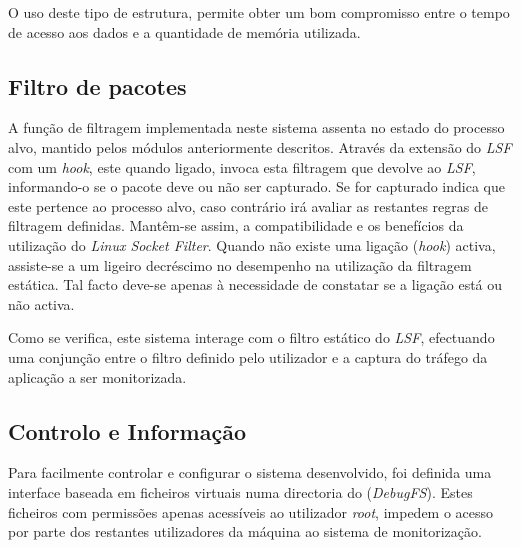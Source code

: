 O uso deste tipo de estrutura, permite obter um bom compromisso entre o tempo de acesso aos dados e a quantidade de memória utilizada.


\subsection{Filtro de pacotes}
\label{sub:packet_filter}

A função de filtragem implementada neste sistema assenta no estado do processo alvo, mantido pelos módulos anteriormente descritos.
Através da extensão do \textit{LSF} com um \textit{hook}, este quando ligado, invoca esta filtragem que devolve ao \textit{LSF}, informando-o se o pacote deve ou não ser capturado.
Se for capturado indica que este pertence ao processo alvo, caso contrário irá avaliar as restantes regras de filtragem definidas.
Mantêm-se assim, a compatibilidade e os benefícios da utilização do \textit{Linux Socket Filter}.
Quando não existe uma ligação (\textit{hook}) activa, assiste-se a um ligeiro decréscimo no desempenho na utilização da filtragem estática.
Tal facto deve-se apenas à necessidade de constatar se a ligação está ou não activa.

Como se verifica, este sistema interage com o filtro estático do \textit{LSF}, efectuando uma conjunção entre o filtro definido pelo utilizador e a captura do tráfego da aplicação a ser monitorizada.


\subsection{Controlo e Informação}
\label{sub:data_information}

Para facilmente controlar e configurar o sistema desenvolvido, foi definida uma interface baseada em ficheiros virtuais numa directoria do (\textit{DebugFS}).
Estes ficheiros com permissões apenas acessíveis ao utilizador \textit{root}, impedem o acesso por parte dos restantes utilizadores da máquina ao sistema de monitorização.



